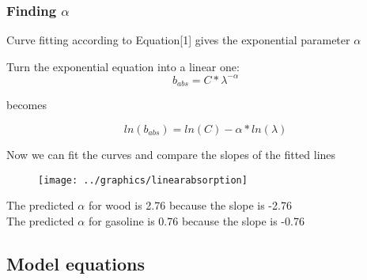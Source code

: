 ﻿\documentclass[ignorenonframetext]{beamer}
\begin{document}
\begin{frame}
\frametitle{Finding \(\alpha\)}
 {
Curve fitting according to Equation{[}1{]} gives the exponential
parameter \(\alpha\)

Turn the exponential equation into a linear one:
\[ b_{abs} = C * \lambda^{-\alpha} \]

becomes

\[ ln(b_{abs}) = ln(C) - \alpha * ln(\lambda) \]
}
 {
Now we can fit the curves and compare the slopes of the fitted lines
\begin{figure}
\begin{center}
\texttt{[image: ../graphics/linearabsorption]}
\end{center}
\end{figure}
The predicted \(\alpha\) for wood is 2.76 because the slope is -2.76\\
The predicted \(\alpha\) for gasoline is 0.76 because the slope is -0.76
}
\end{frame}

\subsection{Model equations}\label{model-equations}
\end{document}

